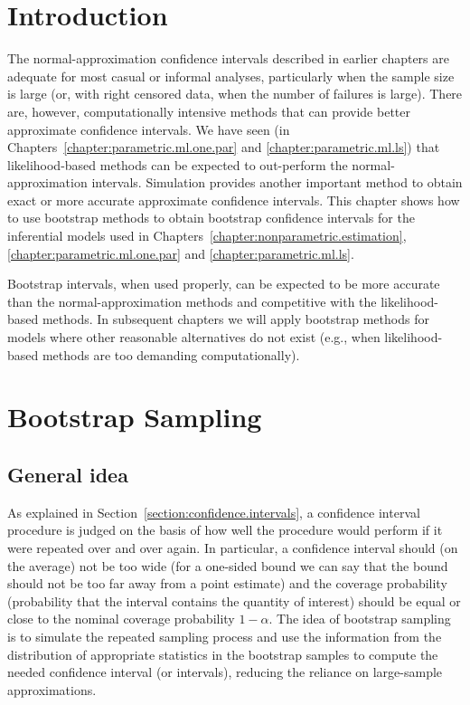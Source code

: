 \section{Introduction}
The normal-approximation confidence intervals described in earlier
chapters are adequate for most casual or informal analyses,
particularly when the sample size is large (or, with right censored data,
when the number of failures is large). There are, however,
computationally intensive methods that can provide better approximate
confidence intervals. We have seen (in
Chapters~\ref{chapter:parametric.ml.one.par} and
\ref{chapter:parametric.ml.ls}) that likelihood-based methods can
be expected to out-perform the normal-approximation intervals. Simulation
provides another important method to obtain exact or more accurate
approximate confidence intervals. This chapter shows how to use bootstrap
methods to obtain bootstrap confidence intervals for the
inferential models used in
Chapters~\ref{chapter:nonparametric.estimation},
\ref{chapter:parametric.ml.one.par} and
\ref{chapter:parametric.ml.ls}. 

Bootstrap intervals, when used properly, can be expected to be more
accurate than the normal-approximation methods and competitive with
the likelihood-based methods.  In subsequent chapters we will apply
bootstrap methods for models where other reasonable alternatives do
not exist (e.g., when likelihood-based methods are too demanding
computationally).




\section{Bootstrap Sampling}
\label{section:bootstrap.sampling}
\subsection{General idea}
As explained in Section~\ref{section:confidence.intervals}, a
confidence interval procedure is judged on the basis of how well the
procedure would perform if it were repeated over and over again. In
particular, a confidence interval should (on the average) not be too
wide (for a one-sided bound we can say that the bound should not be
too far away from a point estimate) and the coverage probability
(probability that the interval contains the quantity of interest)
should be equal or close to the nominal
coverage probability $1-\alpha$. The idea of bootstrap sampling is
to simulate the repeated sampling process and use the information
from the distribution of appropriate statistics in the bootstrap
samples to compute the needed confidence interval (or intervals),
reducing the reliance on large-sample approximations.

